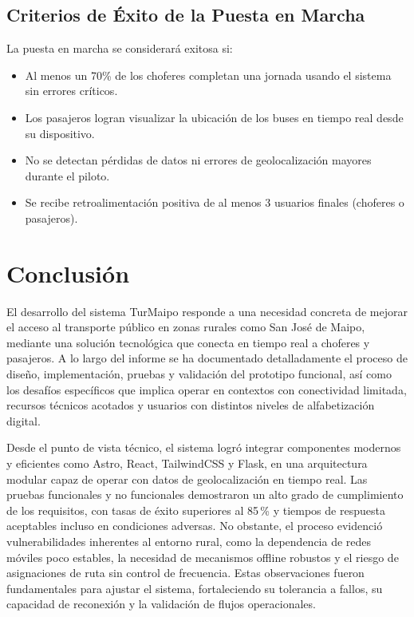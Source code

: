 \documentclass[12pt]{article}
\begin{document}
\subsection{Criterios de Éxito de la Puesta en Marcha}

La puesta en marcha se considerará exitosa si:

\begin{itemize}
    \item Al menos un 70\% de los choferes completan una jornada usando el sistema sin errores críticos.
    \item Los pasajeros logran visualizar la ubicación de los buses en tiempo real desde su dispositivo.
    \item No se detectan pérdidas de datos ni errores de geolocalización mayores durante el piloto.
    \item Se recibe retroalimentación positiva de al menos 3 usuarios finales (choferes o pasajeros).
\end{itemize}

\clearpage
\section{Conclusión}

El desarrollo del sistema TurMaipo responde a una necesidad concreta de mejorar el acceso al transporte público en zonas rurales como San José de Maipo, mediante una solución tecnológica que conecta en tiempo real a choferes y pasajeros. A lo largo del informe se ha documentado detalladamente el proceso de diseño, implementación, pruebas y validación del prototipo funcional, así como los desafíos específicos que implica operar en contextos con conectividad limitada, recursos técnicos acotados y usuarios con distintos niveles de alfabetización digital.

Desde el punto de vista técnico, el sistema logró integrar componentes modernos y eficientes como Astro, React, TailwindCSS y Flask, en una arquitectura modular capaz de operar con datos de geolocalización en tiempo real. Las pruebas funcionales y no funcionales demostraron un alto grado de cumplimiento de los requisitos, con tasas de éxito superiores al 85\,\% y tiempos de respuesta aceptables incluso en condiciones adversas. No obstante, el proceso evidenció vulnerabilidades inherentes al entorno rural, como la dependencia de redes móviles poco estables, la necesidad de mecanismos offline robustos y el riesgo de asignaciones de ruta sin control de frecuencia. Estas observaciones fueron fundamentales para ajustar el sistema, fortaleciendo su tolerancia a fallos, su capacidad de reconexión y la validación de flujos operacionales.
\end{document}
